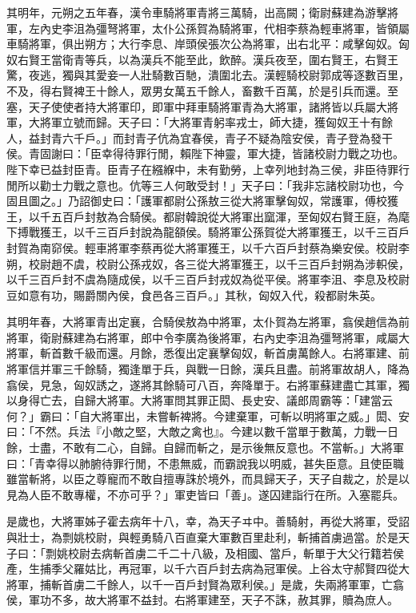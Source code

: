\begin{pinyinscope}
其明年，元朔之五年春，漢令車騎將軍青將三萬騎，出高闕；衛尉蘇建為游擊將軍，左內史李沮為彊弩將軍，太仆公孫賀為騎將軍，代相李蔡為輕車將軍，皆領屬車騎將軍，俱出朔方；大行李息、岸頭侯張次公為將軍，出右北平：咸擊匈奴。匈奴右賢王當衛青等兵，以為漢兵不能至此，飲醉。漢兵夜至，圍右賢王，右賢王驚，夜逃，獨與其愛妾一人壯騎數百馳，潰圍北去。漢輕騎校尉郭成等逐數百里，不及，得右賢裨王十餘人，眾男女萬五千餘人，畜數千百萬，於是引兵而還。至塞，天子使使者持大將軍印，即軍中拜車騎將軍青為大將軍，諸將皆以兵屬大將軍，大將軍立號而歸。天子曰：「大將軍青躬率戎士，師大捷，獲匈奴王十有餘人，益封青六千戶。」而封青子伉為宜春侯，青子不疑為陰安侯，青子登為發干侯。青固謝曰：「臣幸得待罪行閒，賴陛下神靈，軍大捷，皆諸校尉力戰之功也。陛下幸已益封臣青。臣青子在繦緥中，未有勤勞，上幸列地封為三侯，非臣待罪行閒所以勸士力戰之意也。伉等三人何敢受封！」天子曰：「我非忘諸校尉功也，今固且圖之。」乃詔御史曰：「護軍都尉公孫敖三從大將軍擊匈奴，常護軍，傅校獲王，以千五百戶封敖為合騎侯。都尉韓說從大將軍出窳渾，至匈奴右賢王庭，為麾下搏戰獲王，以千三百戶封說為龍頟侯。騎將軍公孫賀從大將軍獲王，以千三百戶封賀為南窌侯。輕車將軍李蔡再從大將軍獲王，以千六百戶封蔡為樂安侯。校尉李朔，校尉趙不虞，校尉公孫戎奴，各三從大將軍獲王，以千三百戶封朔為涉軹侯，以千三百戶封不虞為隨成侯，以千三百戶封戎奴為從平侯。將軍李沮、李息及校尉豆如意有功，賜爵關內侯，食邑各三百戶。」其秋，匈奴入代，殺都尉朱英。

其明年春，大將軍青出定襄，合騎侯敖為中將軍，太仆賀為左將軍，翕侯趙信為前將軍，衛尉蘇建為右將軍，郎中令李廣為後將軍，右內史李沮為彊弩將軍，咸屬大將軍，斬首數千級而還。月餘，悉復出定襄擊匈奴，斬首虜萬餘人。右將軍建、前將軍信并軍三千餘騎，獨逢單于兵，與戰一日餘，漢兵且盡。前將軍故胡人，降為翕侯，見急，匈奴誘之，遂將其餘騎可八百，奔降單于。右將軍蘇建盡亡其軍，獨以身得亡去，自歸大將軍。大將軍問其罪正閎、長史安、議郎周霸等：「建當云何？」霸曰：「自大將軍出，未嘗斬裨將。今建棄軍，可斬以明將軍之威。」閎、安曰：「不然。兵法『小敵之堅，大敵之禽也』。今建以數千當單于數萬，力戰一日餘，士盡，不敢有二心，自歸。自歸而斬之，是示後無反意也。不當斬。」大將軍曰：「青幸得以肺腑待罪行閒，不患無威，而霸說我以明威，甚失臣意。且使臣職雖當斬將，以臣之尊寵而不敢自擅專誅於境外，而具歸天子，天子自裁之，於是以見為人臣不敢專權，不亦可乎？」軍吏皆曰「善」。遂囚建詣行在所。入塞罷兵。

是歲也，大將軍姊子霍去病年十八，幸，為天子ヰ中。善騎射，再從大將軍，受詔與壯士，為剽姚校尉，與輕勇騎八百直棄大軍數百里赴利，斬捕首虜過當。於是天子曰：「剽姚校尉去病斬首虜二千二十八級，及相國、當戶，斬單于大父行籍若侯產，生捕季父羅姑比，再冠軍，以千六百戶封去病為冠軍侯。上谷太守郝賢四從大將軍，捕斬首虜二千餘人，以千一百戶封賢為眾利侯。」是歲，失兩將軍軍，亡翕侯，軍功不多，故大將軍不益封。右將軍建至，天子不誅，赦其罪，贖為庶人。


\end{pinyinscope}
